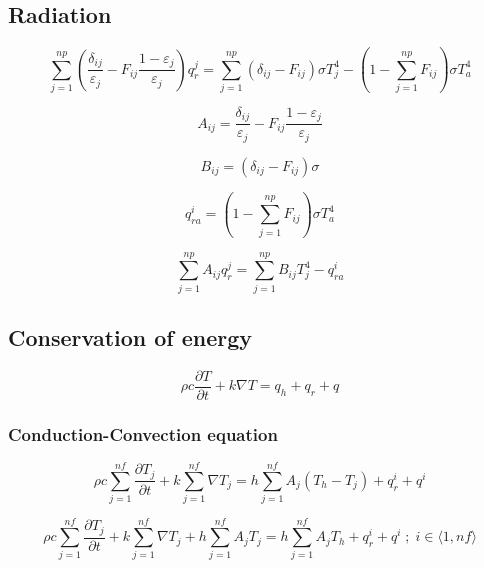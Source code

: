 \documentclass[a4paper,10pt]{book}
\begin{document}
\subsection{Radiation}

    \begin{equation}
    \sum_{j=1}^{np}
        \left(
            \frac{\delta_{ij}}{\varepsilon_j}-F_{ij}\frac{1-\varepsilon_j}{\varepsilon_j}
        \right)q_r^j=
    \sum_{j=1}^{np}\left(\delta_{ij}-F_{ij}\right)\sigma{T_j^4}-
    \left(1-\sum_{j=1}^{np}F_{ij}\right)\sigma{T_a^4}
    \end{equation}

    \begin{equation}
    A_{ij}=\frac{\delta_{ij}}{\varepsilon_j}-F_{ij}\frac{1-\varepsilon_j}{\varepsilon_j}
    \end{equation}

    \begin{equation}
    B_{ij}=\left(\delta_{ij}-F_{ij}\right)\sigma
    \end{equation}

    \begin{equation}
    q_{ra}^i=\left(1-\sum_{j=1}^{np}F_{ij}\right)\sigma{T_a^4}
    \end{equation}

    \begin{equation}
    \sum_{j=1}^{np}A_{ij}q_r^j=\sum_{j=1}^{np}B_{ij}T_j^4-q_{ra}^i
    \end{equation}

\subsection{Conservation of energy}

    \begin{equation}
    \rho{c}\frac{\partial{T}}{\partial{t}}+k\nabla{T}=q_h+q_r+q
    \end{equation}

\subsubsection{Conduction-Convection equation}

    \begin{equation}
    \rho{c}\sum_{j=1}^{nf}\frac{\partial{T_j}}{\partial{t}}+k\sum_{j=1}^{nf}\nabla{T_j}=
    h\sum_{j=1}^{nf}A_j\left(T_h-T_j\right)+q_r^i+q^i
    \end{equation}

    \begin{equation} \label{eq:condconv}
    \rho{c}\sum_{j=1}^{nf}\frac{\partial{T_j}}{\partial{t}}+
    k\sum_{j=1}^{nf}\nabla{T_j}+
    h\sum_{j=1}^{nf}A_jT_j=
    h\sum_{j=1}^{nf}A_jT_h+q_r^i+q^i\;;\;i\in\langle{1,nf}\rangle
    \end{equation}
\end{document}
